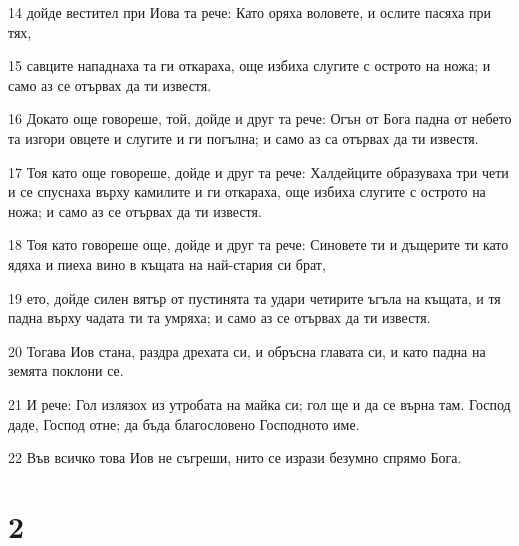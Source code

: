\par 14 дойде вестител при Иова та рече: Като оряха воловете, и ослите пасяха при тях,
\par 15 савците нападнаха та ги откараха, още избиха слугите с острото на ножа; и само аз се отървах да ти известя.
\par 16 Докато още говореше, той, дойде и друг та рече: Огън от Бога падна от небето та изгори овцете и слугите и ги погълна; и само аз са отървах да ти известя.
\par 17 Тоя като още говореше, дойде и друг та рече: Халдейците образуваха три чети и се спуснаха върху камилите и ги откараха, още избиха слугите с острото на ножа; и само аз се отървах да ти известя.
\par 18 Тоя като говореше още, дойде и друг та рече: Синовете ти и дъщерите ти като ядяха и пиеха вино в къщата на най-стария си брат,
\par 19 ето, дойде силен вятър от пустинята та удари четирите ъгъла на къщата, и тя падна върху чадата ти та умряха; и само аз се отървах да ти известя.
\par 20 Тогава Иов стана, раздра дрехата си, и обръсна главата си, и като падна на земята поклони се.
\par 21 И рече: Гол излязох из утробата на майка си; гол ще и да се върна там. Господ даде, Господ отне; да бъда благословено Господното име.
\par 22 Във всичко това Иов не съгреши, нито се изрази безумно спрямо Бога.

\chapter{2}

